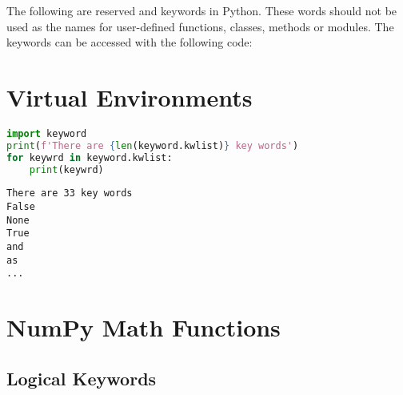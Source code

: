 
    
        The following are reserved and keywords in Python. These words should
not be used as the names for user-defined functions, classes, methods or
modules. The keywords can be accessed with the following code:
    


        \section{Virtual Environments}\label{virtual-environments}
    


    
        \begin{lstlisting}[language=Python]
import keyword
print(f'There are {len(keyword.kwlist)} key words')
for keywrd in keyword.kwlist:
    print(keywrd)
\end{lstlisting}

\begin{lstlisting}
There are 33 key words
False
None
True
and
as
...
\end{lstlisting}
    
    \section{NumPy Math Functions}\label{numpy-math-functions}



    
        \subsection{Logical Keywords}\label{logical-keywords}
    



